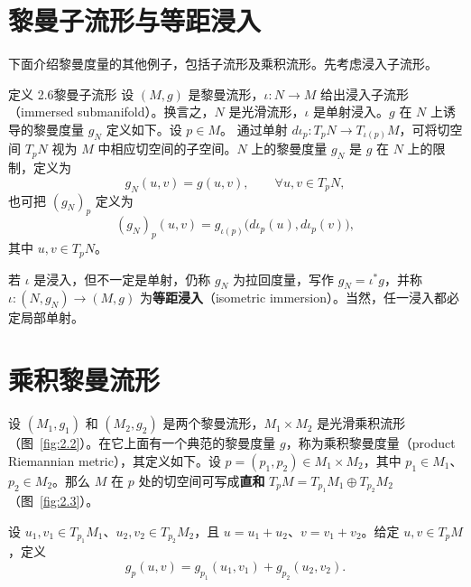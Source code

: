 \section{黎曼子流形与等距浸入}
下面介绍黎曼度量的其他例子，包括子流形及乘积流形。先考虑浸入子流形。

\begin{statement}{定义 2.6}{黎曼子流形}
设 $(M,g)$ 是黎曼流形，$\iota\colon N\to M$ 给出浸入子流形（immersed submanifold）。换言之，$N$ 是光滑流形，$\iota$ 是单射浸入。$g$ 在 $N$ 上诱导的黎曼度量 $g_N$ 定义如下。设 $p\in M$。 通过单射 $d\iota_p\colon T_pN\to T_{\iota(p)}M$，可将切空间 $T_pN$ 视为 $M$ 中相应切空间的子空间。$N$ 上的黎曼度量 $g_N$ 是 $g$ 在 $N$ 上的限制，定义为
\begin{equation*}
  g_N(u,v)=g(u,v),\qquad \forall u,v\in T_pN,
  \tag{2.29}\label{eq:2.29}
\end{equation*}
也可把 $(g_N)_p$ 定义为
\begin{equation*}
  (g_N)_p(u,v)=g_{\iota(p)}\bigl(d\iota_p(u),d\iota_p(v)\bigr),
  \tag{2.30}\label{eq:2.30}
\end{equation*}
其中 $u,v\in T_pN$。

若 $\iota$ 是浸入，但不一定是单射，仍称 $g_N$ 为拉回度量，写作 $g_N=\iota^*g$，并称 $\iota\colon(N,g_N)\to(M,g)$ 为\textbf{等距浸入}（isometric immersion）。当然，任一浸入都必定局部单射。
\end{statement}

\section{乘积黎曼流形}
设 $(M_1,g_1)$ 和 $(M_2,g_2)$ 是两个黎曼流形，$M_1\times M_2$ 是光滑乘积流形（图~\ref{fig:2.2}）。在它上面有一个典范的黎曼度量 $g$，称为乘积黎曼度量（product Riemannian metric），其定义如下。设 $p=(p_1,p_2)\in M_1\times M_2$，其中 $p_1\in M_1$、$p_2\in M_2$。那么 $M$ 在 $p$ 处的切空间可写成\textbf{直和}
$T_pM=T_{p_1}M_1\oplus T_{p_2}M_2$（图~\ref{fig:2.3}）。

设 $u_1,v_1\in T_{p_1}M_1$、$u_2,v_2\in T_{p_2}M_2$，且 $u=u_1+u_2$、$v=v_1+v_2$。给定 $u,v\in T_pM$，定义
\begin{equation*}
  g_p(u,v)=g_{p_1}(u_1,v_1)+g_{p_2}(u_2,v_2).
  \tag{2.31}\label{eq:2.31}
\end{equation*}

\begin{figure}[htbp]
  \centering
  
\end{figure}

